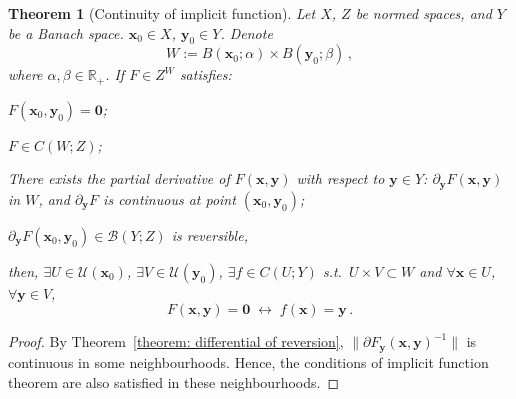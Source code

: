 \documentclass[openany]{book}
\theoremstyle{plain}
\newtheorem{theorem}{Theorem}[section] %
\theoremstyle{definition}
\newcommand*{\bv}{\boldsymbol} %
\newcommand*{\IFF}{\;\leftrightarrow\;} %
\begin{document}
\begin{theorem}[Continuity of implicit function]
	\label{theorem: continuity of implicit function}
	Let $X$, $Z$ be normed spaces, and $Y$ be a Banach space.
	$\bv x_0 \in X$, $\bv y_0 \in Y$. Denote
	\begin{equation*}
		W := B(\bv x_0; \alpha) \times B(\bv y_0; \beta)\,,
	\end{equation*}
	where $\alpha, \beta \in \mathbb R_+$.
	If $F \in Z^W$ satisfies:
	\begin{conditionlist}[label=\alph*)]
		\item $F(\bv x_0, \bv y_0) = \bv 0$;
		\item $F \in C (W; Z)$; 
		\item There exists the partial derivative of $F(\bv x, \bv y)$ with respect to $\bv y \in Y$: $\partial_{\bv y} F(\bv x, \bv y)$ in $W$, and $\partial_{\bv y} F$ is continuous at point $(\bv x_0, \bv y_0)$;
		\item $\partial_{\bv y} F(\bv x_0, \bv y_0) \in \mathcal B(Y; Z)$ is reversible,
	\end{conditionlist}
	then, $\exists U \in \mathscr U(\bv x_0)$, $\exists V \in \mathscr U(\bv y_0)$, $\exists f \in C(U; Y)$ s.t.\ $U \times V \subset W$ and $\forall \bv x \in U$, $\forall \bv y \in V$, 
	\begin{equation*}
		F(\bv x, \bv y) = \bv 0
		\IFF
		f(\bv x) = \bv y\,.
	\end{equation*}
\end{theorem}
\begin{proof}
	By Theorem~\ref{theorem: differential of reversion}, $\|\partial F_{\bv y}(\bv x, \bv y)^{-1}\|$ is continuous in some neighbourhoods. 
	Hence, the conditions of implicit function theorem are also satisfied in these neighbourhoods.
\end{proof}
\end{document}

